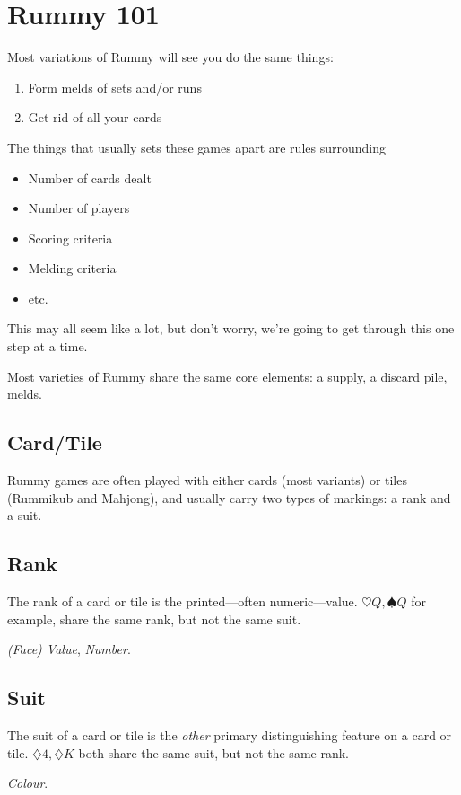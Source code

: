 \section{Rummy 101}
Most variations of Rummy will see you do the same things: 
\begin{enumerate}
    \item Form melds of sets and/or runs
    \item Get rid of all your cards
\end{enumerate}
The things that usually sets these games apart are rules surrounding
\begin{itemize}
    \item Number of cards dealt
    \item Number of players
    \item Scoring criteria
    \item Melding criteria
    \item etc.
\end{itemize}
This may all seem like a lot, but don't worry, we're going to get through this one step at a time.

Most varieties of Rummy share the same core elements: a supply, a discard pile, melds.

\subsection{Card/Tile}
Rummy games are often played with either cards (most variants) or tiles (Rummikub and Mahjong), and usually carry two types of markings: a rank and a suit.

\subsection{Rank}
The rank of a card or tile is the printed---often numeric---value. $\heartsuit Q, \spadesuit Q$ for example, share the same rank, but not the same suit.

\otherNames \textit{(Face) Value}, \textit{Number}.

\subsection{Suit}
The suit of a card or tile is the \textit{other} primary distinguishing feature on a card or tile. $\diamondsuit 4, \diamondsuit K$ both share the same suit, but not the same rank.

\otherNames \textit{Colour}.


